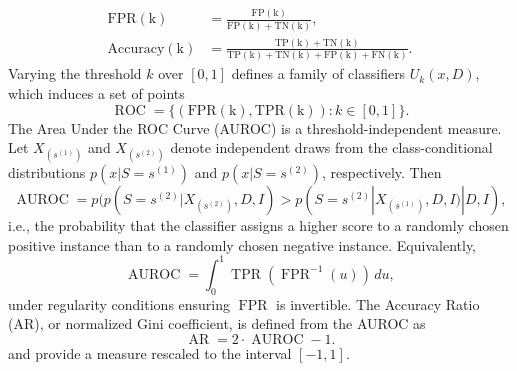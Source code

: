 \begin{example}
\begin{align}
		\operatorname{FPR(k)} &= \frac{\operatorname{FP(k)}}{\operatorname{FP(k)} + \operatorname{TN(k)}},\\
		\operatorname{Accuracy(k)} &= \frac{\operatorname{TP(k)} + \operatorname{TN(k)}}{\operatorname{TP(k)} + \operatorname{TN(k)} + \operatorname{FP(k)} + \operatorname{FN(k)}}.
	\end{align}
	Varying the threshold $k$ over $[0,1]$ defines a family of classifiers $U_k(x,D)$, which induces a set of points
	\begin{equation}
		\operatorname{ROC} = \{ (\operatorname{FPR(k)}, \operatorname{TPR(k)}) : k \in [0,1] \}.
	\end{equation}
	The Area Under the ROC Curve (AUROC) is a threshold-independent measure. Let $X_{(s^{(1)})}$ and $X_{(s^{(2)})}$ denote independent draws from the class-conditional distributions $p(x | S = s^{(1)})$ and $p(x | S = s^{(2)})$, respectively. Then
	\begin{equation}
		\operatorname{AUROC} = p( p(S=s^{(2)} | X_{(s^{(2)})}, D, I) > p(S=s^{(2)} | X_{(s^{(1)})}, D, I)| D, I ),
	\end{equation}
	i.e., the probability that the classifier assigns a higher score to a randomly chosen positive instance than to a randomly chosen negative instance. Equivalently,
	\begin{equation}
		\operatorname{AUROC} = \int_0^1 \operatorname{TPR}(\operatorname{FPR}^{-1}(u)) \, du,
	\end{equation}
	under regularity conditions ensuring $\operatorname{FPR}$ is invertible. The Accuracy Ratio (AR), or normalized Gini coefficient, is defined from the AUROC as
	\begin{equation}
		\operatorname{AR} = 2 \cdot \operatorname{AUROC} - 1.
	\end{equation}
	and provide a measure rescaled to the interval $[-1,1]$.
	
\end{example}


